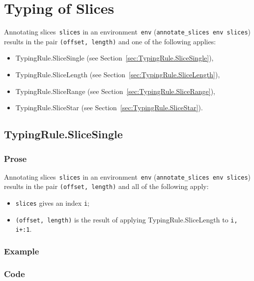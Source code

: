 \documentclass{book}
\begin{document}
\chapter{Typing of Slices}

Annotating slices~\texttt{slices} in an environment~\texttt{env}
(\texttt{annotate\_slices env slices}) results in the pair \texttt{(offset,
length)} and one of the following applies:
\begin{itemize}
\item TypingRule.SliceSingle (see Section~\ref{sec:TypingRule.SliceSingle}),
\item TypingRule.SliceLength (see Section~\ref{sec:TypingRule.SliceLength}),
\item TypingRule.SliceRange (see Section~\ref{sec:TypingRule.SliceRange}),
\item TypingRule.SliceStar (see Section~\ref{sec:TypingRule.SliceStar}).
\end{itemize}

\section{TypingRule.SliceSingle \label{sec:TypingRule.SliceSingle}}

  \subsection{Prose}
   Annotating slices~\texttt{slices} in an environment~\texttt{env}
(\texttt{annotate\_slices env slices}) results in the pair \texttt{(offset,
length)} and all of the following apply:
   \begin{itemize}
   \item \texttt{slices} gives an index \texttt{i};
   \item \texttt{(offset, length)} is the result of applying TypingRule.SliceLength to \texttt{i, i+:1}.
   \end{itemize}

  \subsection{Example}

  \subsection{Code}
\end{document}
